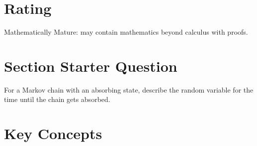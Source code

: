 \documentclass[12pt]{article}
\begin{document}
\myheader \mytitle

\hr


\hr

\usefirefox

\hr



\section*{Rating} %
Mathematically Mature:  may contain mathematics beyond calculus with
proofs.  %

\hr

\section*{Section Starter Question}

For a Markov chain with an absorbing state, describe the random variable
for the time until the chain gets absorbed.

\hr

\section*{Key Concepts}
\end{document}

